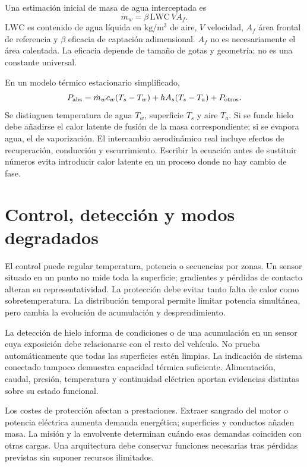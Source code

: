 Una estimación inicial de masa de agua interceptada es
\begin{equation}
 \dot m_w=\beta\,\mathrm{LWC}\,V A_f.
\end{equation}
$\mathrm{LWC}$ es contenido de agua líquida en $\mathrm{kg/m^3}$ de aire, $V$ velocidad, $A_f$ área frontal de referencia y $\beta$ eficacia de captación adimensional. $A_f$ no es necesariamente el área calentada. La eficacia depende de tamaño de gotas y geometría; no es una constante universal.

En un modelo térmico estacionario simplificado,
\begin{equation}
 P_{\rm abs}=\dot m_wc_w(T_s-T_w)+hA_s(T_s-T_a)+P_{\rm otros}.
\end{equation}
Se distinguen temperatura de agua $T_w$, superficie $T_s$ y aire $T_a$. Si se funde hielo debe añadirse el calor latente de fusión de la masa correspondiente; si se evapora agua, el de vaporización. El intercambio aerodinámico real incluye efectos de recuperación, conducción y escurrimiento. Escribir la ecuación antes de sustituir números evita introducir calor latente en un proceso donde no hay cambio de fase.

\section{Control, detección y modos degradados}
El control puede regular temperatura, potencia o secuencias por zonas. Un sensor situado en un punto no mide toda la superficie; gradientes y pérdidas de contacto alteran su representatividad. La protección debe evitar tanto falta de calor como sobretemperatura. La distribución temporal permite limitar potencia simultánea, pero cambia la evolución de acumulación y desprendimiento.

La detección de hielo informa de condiciones o de una acumulación en un sensor cuya exposición debe relacionarse con el resto del vehículo. No prueba automáticamente que todas las superficies estén limpias. La indicación de sistema conectado tampoco demuestra capacidad térmica suficiente. Alimentación, caudal, presión, temperatura y continuidad eléctrica aportan evidencias distintas sobre su estado funcional.

Los costes de protección afectan a prestaciones. Extraer sangrado del motor o potencia eléctrica aumenta demanda energética; superficies y conductos añaden masa. La misión y la envolvente determinan cuándo esas demandas coinciden con otras cargas. Una arquitectura debe conservar funciones necesarias tras pérdidas previstas sin suponer recursos ilimitados.

